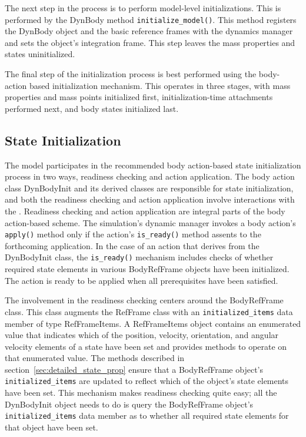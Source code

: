 The next step in the process is to perform model-level initializations.
This is performed by the DynBody method {\tt initialize\_model()}.
This method registers the DynBody object and the basic reference frames with the dynamics manager and sets the object's integration frame.
This step leaves the mass properties and states uninitialized.

The final step of the initialization process is best performed using the
body-action based initialization mechanism. This operates in three stages,
with mass properties and mass points initialized first, initialization-time
attachments performed next, and body states initialized last.

\subsection{State Initialization}
The model participates in the recommended body action-based state initialization
process in two ways, readiness checking and action application.
The body action class DynBodyInit and its derived classes are responsible
for state initialization, and both the readiness checking and action application
involve interactions with the \ModelDesc.
Readiness checking and action application are integral parts of the body
action-based scheme. The simulation's dynamic manager invokes a body action's
\verb+apply()+ method only if the action's \verb+is_ready()+ method assents to
the forthcoming application.
In the case of an action that derives from the DynBodyInit class, the
\verb+is_ready()+ mechanism includes checks of whether required state elements
in various BodyRefFrame objects have been initialized. The
action is ready
to be applied when all prerequisites have been satisfied.

The \ModelDesc involvement in the readiness checking centers around the
BodyRefFrame class. This class augments the RefFrame class with an
\verb+initialized_items+ data member of type RefFrameItems.
A RefFrameItems object contains an enumerated value that indicates which of the
position, velocity, orientation, and angular velocity elements of a state have
been set and provides methods to operate on that enumerated value.
The \ModelDesc methods described in section~\ref{sec:detailed_state_prop} ensure
 that a BodyRefFrame object's \verb+initialized_items+ are updated to reflect
which of the object's state elements have been set.
This mechanism makes readiness checking quite easy; all the DynBodyInit object
needs to do is query the BodyRefFrame object's \verb+initialized_items+ data
member as to whether all required state elements for that object have been set.

